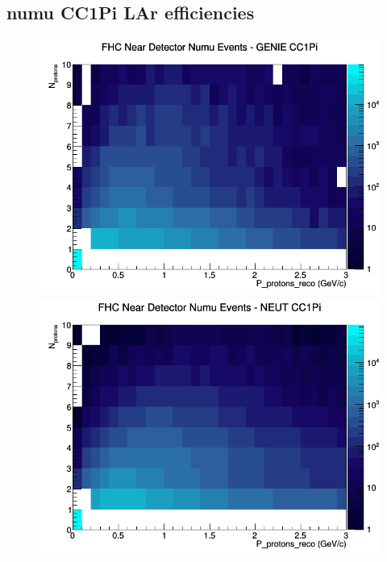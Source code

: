 \subsection{numu CC1Pi LAr efficiencies}
\begin{figure}[h]
\includegraphics[width=\linewidth]{eff_N_P/LAr/protons/CC1Pi_FHC_ND_numu_N_P_GENIE.png}
\endminipage
{}
\includegraphics[width=\linewidth]{eff_N_P/LAr/protons/CC1Pi_FHC_ND_numu_N_P_NEUT.png}
\endminipage
{}

\end{figure}
